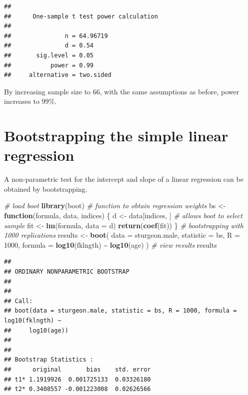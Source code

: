 \documentclass[
  12pt,
]{book}
\newenvironment{Shaded}{\begin{snugshade}}{\end{snugshade}}
\newcommand{\CommentTok}[1]{\textcolor[rgb]{0.56,0.35,0.01}{\textit{#1}}}
\newcommand{\ControlFlowTok}[1]{\textcolor[rgb]{0.13,0.29,0.53}{\textbf{#1}}}
\newcommand{\DataTypeTok}[1]{\textcolor[rgb]{0.13,0.29,0.53}{#1}}
\newcommand{\DecValTok}[1]{\textcolor[rgb]{0.00,0.00,0.81}{#1}}
\newcommand{\KeywordTok}[1]{\textcolor[rgb]{0.13,0.29,0.53}{\textbf{#1}}}
\newcommand{\NormalTok}[1]{#1}
\newcommand{\OperatorTok}[1]{\textcolor[rgb]{0.81,0.36,0.00}{\textbf{#1}}}
\newcommand{\StringTok}[1]{\textcolor[rgb]{0.31,0.60,0.02}{#1}}
\begin{document}
\begin{verbatim}
## 
##      One-sample t test power calculation 
## 
##               n = 64.96719
##               d = 0.54
##       sig.level = 0.05
##           power = 0.99
##     alternative = two.sided
\end{verbatim}

By increasing sample size to 66, with the same assumptions as before, power increases to 99\%.

\hypertarget{bootstrapping-the-simple-linear-regression}{%
\section{Bootstrapping the simple linear regression}\label{bootstrapping-the-simple-linear-regression}}

A non-parametric test for the intercept and slope of a linear regression can be obtained by bootstrapping.

\begin{Shaded}
\begin{Highlighting}[]
\CommentTok{\# load boot}
\KeywordTok{library}\NormalTok{(boot)}
\CommentTok{\# function to obtain regression weights}
\NormalTok{bs \textless{}{-}}\StringTok{ }\ControlFlowTok{function}\NormalTok{(formula, data, indices) \{}
\NormalTok{  d \textless{}{-}}\StringTok{ }\NormalTok{data[indices, ] }\CommentTok{\# allows boot to select sample}
\NormalTok{  fit \textless{}{-}}\StringTok{ }\KeywordTok{lm}\NormalTok{(formula, }\DataTypeTok{data =}\NormalTok{ d)}
  \KeywordTok{return}\NormalTok{(}\KeywordTok{coef}\NormalTok{(fit))}
\NormalTok{\}}
\CommentTok{\# bootstrapping with 1000 replications}
\NormalTok{results \textless{}{-}}\StringTok{ }\KeywordTok{boot}\NormalTok{(}
  \DataTypeTok{data =}\NormalTok{ sturgeon.male,}
  \DataTypeTok{statistic =}\NormalTok{ bs,}
  \DataTypeTok{R =} \DecValTok{1000}\NormalTok{, }\DataTypeTok{formula =} \KeywordTok{log10}\NormalTok{(fklngth) }\OperatorTok{\textasciitilde{}}\StringTok{ }\KeywordTok{log10}\NormalTok{(age)}
\NormalTok{)}
\CommentTok{\# view results}
\NormalTok{results}
\end{Highlighting}
\end{Shaded}

\begin{verbatim}
## 
## ORDINARY NONPARAMETRIC BOOTSTRAP
## 
## 
## Call:
## boot(data = sturgeon.male, statistic = bs, R = 1000, formula = log10(fklngth) ~ 
##     log10(age))
## 
## 
## Bootstrap Statistics :
##      original       bias    std. error
## t1* 1.1919926  0.001725133  0.03326180
## t2* 0.3408557 -0.001223008  0.02626566
\end{verbatim}
\end{document}
